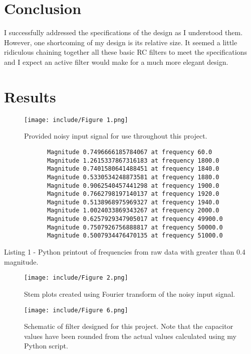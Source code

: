 \documentclass[12pt]{article}
\begin{document}
\section{Conclusion}
    I successfully addressed the specifications of the design as I understood them. However, one shortcoming of my design is its relative size. It seemed a little ridiculous chaining together all these basic RC filters to meet the specifications and I expect an active filter would make for a much more elegant design.
    
\newpage
\section*{Results}

\begin{figure}[H]
\centering
\texttt{[image: include/Figure 1.png]}
\caption{Provided noisy input signal for use throughout this project.}
\end{figure}

\begin{verbatim}
            Magnitude 0.7496666185784067 at frequency 60.0
            Magnitude 1.2615337867316183 at frequency 1800.0
            Magnitude 0.7401580641488451 at frequency 1840.0
            Magnitude 0.5330534248873581 at frequency 1880.0
            Magnitude 0.9062540457441298 at frequency 1900.0
            Magnitude 0.7662798197140137 at frequency 1920.0
            Magnitude 0.5138968975969327 at frequency 1940.0
            Magnitude 1.0024033869343267 at frequency 2000.0
            Magnitude 0.6257929347905017 at frequency 49900.0
            Magnitude 0.7507926756888817 at frequency 50000.0
            Magnitude 0.5007934476470135 at frequency 51000.0
\end{verbatim}
\begin{center}
Listing 1 - Python printout of frequencies from raw data with greater than 0.4 magnitude.
\end{center}

\begin{figure}[H]
\centering
\texttt{[image: include/Figure 2.png]}
\caption{Stem plots created using Fourier transform of the noisy input signal.}
\end{figure}

\begin{figure}[H]
    \centering
    \texttt{[image: include/Figure 6.png]}
    \caption{Schematic of filter designed for this project. Note that the capacitor values have been rounded from the actual values calculated using my Python script.}
\end{figure}
\end{document}
